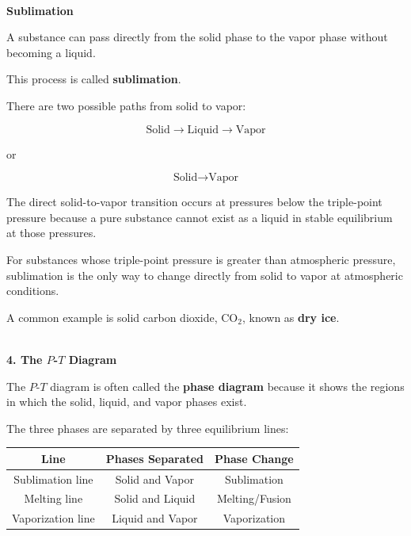 \documentclass[12pt]{article}
\begin{document}
\textbf{\\ Sublimation}

A substance can pass directly from the solid phase to the vapor phase without becoming a liquid.

This process is called \textbf{sublimation}.

There are two possible paths from solid to vapor:

\begin{equation*}
\text{Solid}
\rightarrow
\text{Liquid}
\rightarrow
\text{Vapor}
\end{equation*}

or

\begin{equation*}
\boxed{\text{Solid}\rightarrow\text{Vapor}}
\end{equation*}

The direct solid-to-vapor transition occurs at pressures below the triple-point pressure because a pure substance cannot exist as a liquid in stable equilibrium at those pressures.

For substances whose triple-point pressure is greater than atmospheric pressure, sublimation is the only way to change directly from solid to vapor at atmospheric conditions.

A common example is solid carbon dioxide, $\mathrm{CO_2}$, known as \textbf{dry ice}.

\textbf{\\ 4. The $P$-$T$ Diagram}

The $P$-$T$ diagram is often called the \textbf{phase diagram} because it shows the regions in which the solid, liquid, and vapor phases exist.

The three phases are separated by three equilibrium lines:

\begin{center}
    \begin{tabular}{|c|c|c|}
        \hline
        \textbf{Line} & \textbf{Phases Separated} & \textbf{Phase Change} \\
        \hline
        Sublimation line & Solid and Vapor & Sublimation \\
        \hline
        Melting line & Solid and Liquid & Melting/Fusion \\
        \hline
        Vaporization line & Liquid and Vapor & Vaporization \\
        \hline
    \end{tabular}
\end{center}
\end{document}
